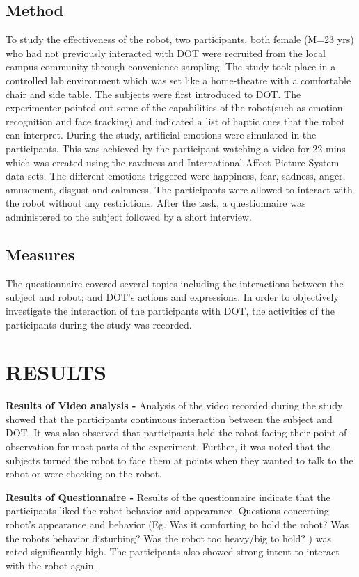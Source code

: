 \documentclass[letterpaper, 10 pt, conference]{ieeeconf}  %
\begin{document}
\subsection{Method}
To study the effectiveness of the robot, two participants, both female (M=23 yrs) who had not previously interacted with DOT were recruited from the local campus community through convenience sampling. The study took place in a controlled lab environment which was set like a home-theatre with a comfortable chair and side table.  
The subjects were first introduced to DOT. The experimenter pointed out some of the capabilities of the
robot(such as emotion recognition and face tracking) and indicated a list of haptic cues that the robot can interpret. During the study, artificial emotions were simulated in the participants. This
was achieved by the participant watching a video for 22 mins which was created using the ravdness \cite{} and International Affect Picture System \cite{} data-sets. The different emotions triggered were happiness, fear, sadness, anger, amusement, disgust and calmness. The participants were allowed to interact with the robot without any restrictions. After the task, a questionnaire was administered to the
subject followed by a short interview. 

\subsection{Measures}
The questionnaire covered several topics including the interactions between the subject and robot; and DOT’s actions and expressions. In order to objectively investigate the interaction of the participants with DOT, the activities of the participants during the study was recorded.

\section{RESULTS}
\textbf{Results of Video analysis -}
Analysis of the video recorded during the study showed that the participants continuous interaction between the subject and DOT. It was also observed that participants held the robot facing their point of observation for most parts of the experiment. Further, it was noted that the subjects turned the robot to face them at points when they wanted to talk to the robot or were checking on the robot. 

\textbf{Results of Questionnaire -}
Results of the questionnaire indicate that the participants liked the robot behavior and appearance. Questions concerning robot’s appearance and behavior (Eg. Was it comforting to hold the robot? Was the robots behavior disturbing? Was the robot too heavy/big to hold? ) was rated significantly high. The participants also showed strong intent to interact with the robot again.  
\end{document}
